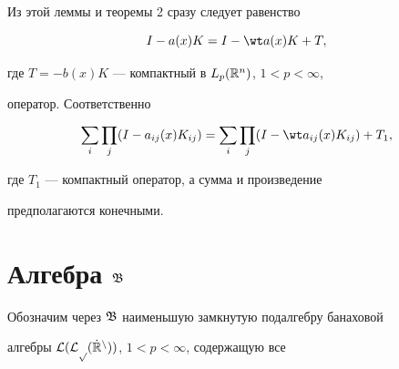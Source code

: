 




Из этой леммы и теоремы 2 сразу следует равенство


$$


I-a(x)K=I-\wt a(x)K+T,


$$


где $T=-b(x)K$ --- компактный в $L_p(\Bbb R^n)$, $1<p<\infty$,


оператор. Соответственно


\begin{equation}


\sum_i\prod_j(I-a_{ij}(x)K_{ij})=


\sum_i\prod_j(I-\wt a_{ij}(x)K_{ij})+T_1,


\label{9}


\end{equation}


где $T_1$ --- компактный оператор, а сумма и произведение


предполагаются конечными.





\section{Алгебра $\frak B$}





Обозначим через $\frak B$ наименьшую замкнутую подалгебру банаховой


алгебры $\cal L(L_p(\dot{\Bbb R}^n))$, $1<p<\infty$, содержащую все


